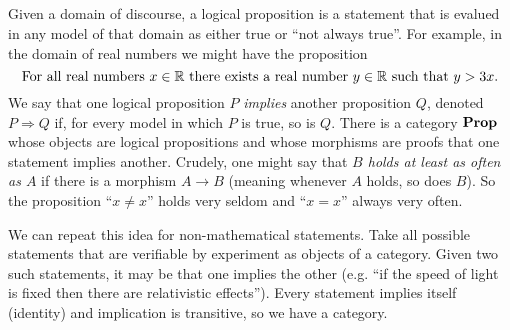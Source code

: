 \documentclass[CT4S-EN-RU]{subfiles}
\begin{document}
\begin{exerciseRUS}
\end{exerciseRUS}


\subsection{}


\subsubsection{}\label{sec:propositions}

\begin{blockENG}
Given a domain of discourse, a logical proposition is a statement that is evalued in any model of that domain as either true or “not always true”. For example, in the domain of real numbers we might have the proposition 
$$\textnormal{For all real numbers }x\in{\mathbb R}\textnormal{ there exists a real number } y\in{\mathbb R}\textnormal{ such that }y>3x.$$
We say that one logical proposition $P$ {\em implies} another proposition $Q$, denoted $P\Rightarrow Q$ if, for every model in which $P$ is true, so is $Q$. There is a category ${\mathbf{Prop}}$ whose objects are logical propositions and whose morphisms are proofs that one statement implies another. Crudely, one might say that {\em $B$ holds at least as often as $A$} if there is a morphism $A\to B$ (meaning whenever $A$ holds, so does $B$). So the proposition “$x\neq x$” holds very seldom and “$x=x$” always very often.
\end{blockENG}

\begin{blockRUS}
\end{blockRUS}

\begin{exampleENG}
We can repeat this idea for non-mathematical statements. Take all possible statements that are verifiable by experiment as objects of a category. Given two such statements, it may be that one implies the other (e.g. “if the speed of light is fixed then there are relativistic effects”). Every statement implies itself (identity) and implication is transitive, so we have a category. 
\end{exampleENG}
\end{document}
